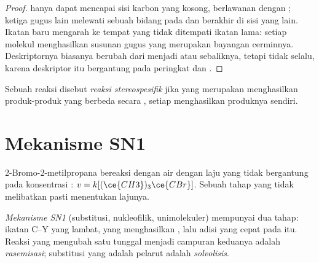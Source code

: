 \begin{proof}
 hanya dapat mencapai sisi karbon yang kosong, berlawanan
dengan ; ketiga gugus lain melewati sebuah bidang pada
 dan berakhir di sisi yang lain. Ikatan baru mengarah ke
tempat yang tidak ditempati ikatan lama: setiap molekul 
menghasilkan susunan gugus yang merupakan bayangan cerminnya.
Deskriptornya biasanya berubah dari  menjadi  atau
sebaliknya, tetapi tidak selalu, karena deskriptor itu bergantung pada
peringkat  dan .
\end{proof}

\begin{definition}\label{def:b1:nucleophilic-substitution:stereospecific}
Sebuah reaksi disebut
\emph{reaksi stereospesifik} jika  yang merupakan 
menghasilkan produk-produk yang berbeda secara , setiap
 menghasilkan produknya sendiri.
\end{definition}

\section{Mekanisme SN1}

2-Bromo-2-metilpropana bereaksi dengan air dengan laju yang tidak
bergantung pada konsentrasi : $v = k[(\ce{CH3})_3\ce{CBr}]$.
Sebuah tahap yang tidak melibatkan  pasti menentukan lajunya.

\begin{definition}\label{def:b1:nucleophilic-substitution:sn1}
\emph{Mekanisme SN1} (substitusi, nukleofilik,
unimolekuler) mempunyai dua tahap:  ikatan C--Y yang lambat,
yang menghasilkan , lalu adisi  yang cepat pada
 itu. Reaksi yang mengubah satu  tunggal menjadi
campuran keduanya adalah \emph{rasemisasi};
substitusi yang  adalah pelarut adalah
\emph{solvolisis}.
\end{definition}

